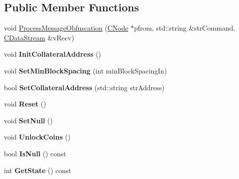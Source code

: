\subsection*{Public Member Functions}
\begin{DoxyCompactItemize}
\item 
void \mbox{\hyperlink{class_c_obfuscation_pool_a9018f786df376b190c391bbf774be9d6}{Process\+Message\+Obfuscation}} (\mbox{\hyperlink{class_c_node}{C\+Node}} $\ast$pfrom, std\+::string \&str\+Command, \mbox{\hyperlink{class_c_data_stream}{C\+Data\+Stream}} \&v\+Recv)
\item 
\mbox{\label{class_c_obfuscation_pool_aa040695f32a21d3abc6ceaa9d8805779}} 
void {\bfseries Init\+Collateral\+Address} ()
\item 
\mbox{\label{class_c_obfuscation_pool_a91df9629be1da05a574bafa3012d8d4f}} 
void {\bfseries Set\+Min\+Block\+Spacing} (int min\+Block\+Spacing\+In)
\item 
\mbox{\label{class_c_obfuscation_pool_aa799d03fe720586f1410035e3e2dba94}} 
bool {\bfseries Set\+Collateral\+Address} (std\+::string str\+Address)
\item 
\mbox{\label{class_c_obfuscation_pool_a36e70e529e712c05b04d19dd07b7044d}} 
void {\bfseries Reset} ()
\item 
\mbox{\label{class_c_obfuscation_pool_a4c0977ba94ace56440b595c7f2ac2e42}} 
void {\bfseries Set\+Null} ()
\item 
\mbox{\label{class_c_obfuscation_pool_aa8020a6f75404ddbde8dfee08c6a5322}} 
void {\bfseries Unlock\+Coins} ()
\item 
\mbox{\label{class_c_obfuscation_pool_a417d2e31b1a8bf70f353267534972aef}} 
bool {\bfseries Is\+Null} () const
\item 
\mbox{\label{class_c_obfuscation_pool_a38bb07f27e294022673ac6a83d18649d}} 
int {\bfseries Get\+State} () const
\item 
\mbox{\label{class_c_obfuscation_pool_a16c2ad30d227d09e15ba4277b0a22fab}} 

\end{DoxyCompactItemize}

